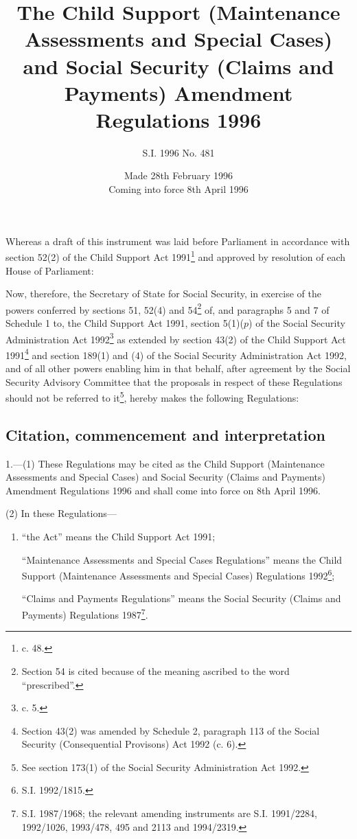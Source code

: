 \documentclass[a4paper]{article}
\title{The Child Support (Maintenance Assessments and Special Cases) and Social Security (Claims and Payments) Amendment Regulations 1996}
\author{S.I. 1996 No. 481}
\date{Made 28th February 1996\\Coming into force 8th April 1996
}
\begin{document}
\maketitle

\noindent
Whereas a draft of this instrument was laid before Parliament in accordance with section 52(2) of the Child Support Act 1991\footnote{ c. 48.} and approved by resolution of each House of Parliament:

 Now, therefore, the Secretary of State for Social Security, in exercise of the powers conferred by sections 51, 52(4) and 54\footnote{\frenchspacing Section 54 is cited because of the meaning ascribed to the word “prescribed”.} of, and paragraphs 5 and 7 of Schedule 1 to, the Child Support Act 1991, section 5(1)($p$) of the Social Security Administration Act 1992\footnote{ c. 5.} as extended by section 43(2) of the Child Support Act 1991\footnote{\frenchspacing Section 43(2) was amended by Schedule 2, paragraph 113 of the Social Security (Consequential Provisons) Act 1992 (c. 6).} and section 189(1) and (4) of the Social Security Administration Act 1992, and of all other powers enabling him in that behalf, after agreement by the Social Security Advisory Committee that the proposals in respect of these Regulations should not be referred to it\footnote{\frenchspacing See section 173(1) of the Social Security Administration Act 1992.}, hereby makes the following Regulations:


{\sloppy

\tableofcontents

}

\setcounter{secnumdepth}{-2}

\subsection[1. Citation, commencement and interpretation]{Citation, commencement and interpretation}

1.—(1) These Regulations may be cited as the Child Support (Maintenance Assessments and Special Cases) and Social Security (Claims and Payments) Amendment Regulations 1996 and shall come into force on 8th April 1996.

(2) In these Regulations—
\begin{enumerate}\item[]
“the Act” means the Child Support Act 1991;

“Maintenance Assessments and Special Cases Regulations” means the Child Support (Maintenance Assessments and Special Cases) Regulations 1992\footnote{\frenchspacing S.I. 1992/1815.};

“Claims and Payments Regulations” means the Social Security (Claims and Payments) Regulations 1987\footnote{\frenchspacing S.I. 1987/1968; the relevant amending instruments are S.I. 1991/2284, 1992/1026, 1993/478, 495 and 2113 and 1994/2319.}.
\end{enumerate}
\end{document}
